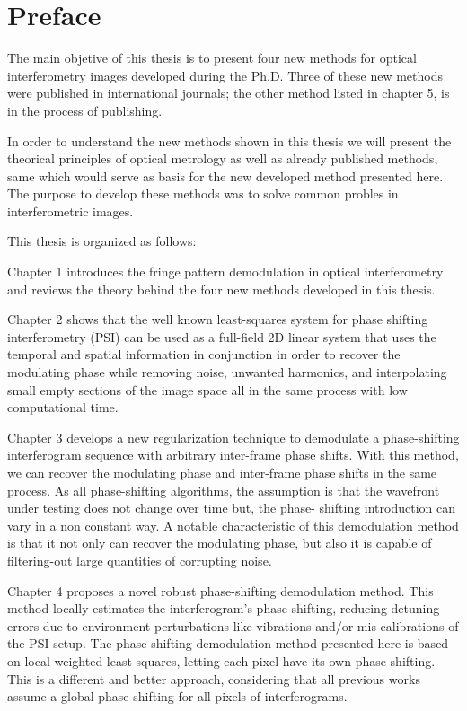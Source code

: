 \chapter*{Preface}

The main objetive of this thesis is to present four new methods for optical 
interferometry images developed during the Ph.D. Three of these new methods were 
published in international journals; the other method listed in chapter 5, is in
the process of publishing.

In order to understand the new methods shown in this thesis we will present the
theorical principles of optical metrology as well as already published methods, 
same which would serve as basis for the new developed method presented here. 
The purpose to develop these methods was to solve common probles in interferometric
images. 

This thesis is organized as follows:

Chapter 1 introduces the fringe pattern demodulation in optical 
interferometry and reviews the theory behind the four new methods developed in 
this thesis.

Chapter 2 shows that the well known least-squares system for phase shifting 
interferometry (PSI) can be used as a full-field 2D linear system that uses the 
temporal and spatial information in conjunction in order to recover the modulating 
phase while removing noise, unwanted harmonics, and interpolating small empty
sections of the image space all in the same process with low computational time.

Chapter 3 develops a new regularization technique to demodulate a 
phase-shifting interferogram sequence with arbitrary inter-frame phase shifts. 
With this method, we can recover the modulating phase and inter-frame phase
shifts in the same process. As all phase-shifting algorithms, the assumption
is that the wavefront under testing does not change over time but, the phase-
shifting introduction can vary in a non constant way. A notable characteristic
of this demodulation method is that it not only can recover the modulating
phase, but also it is capable of filtering-out large quantities of corrupting
noise.

Chapter 4 proposes a novel robust phase-shifting demodulation method. 
This method locally estimates the interferogram's phase-shifting, reducing 
detuning errors due to environment perturbations like vibrations and/or 
mis-calibrations of the PSI setup. The phase-shifting demodulation method
presented here is based on local weighted least-squares, letting each pixel
have its own phase-shifting. This is a different and better approach, considering 
that all previous works assume a global phase-shifting for all pixels
of interferograms.

